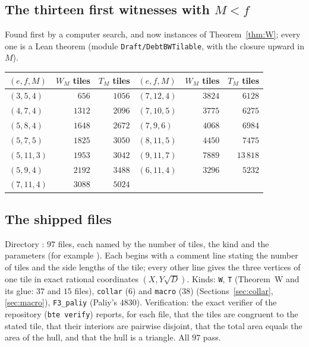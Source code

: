 \documentclass[11pt,reqno]{amsart}
\theoremstyle{plain}
\theoremstyle{definition}
\begin{document}
\subsection{The thirteen first witnesses with $M<f$}
Found first by a computer search, and now instances of Theorem~\ref{thm:W}; every one is a Lean theorem (module \texttt{Draft/DebtBWTilable}, with the closure upward in $M$).
\begin{center}\small
\begin{tabular}{@{}lrr@{\qquad}lrr@{}}
\toprule
$(e,f,M)$ & $W_M$ tiles & $T_M$ tiles & $(e,f,M)$ & $W_M$ tiles & $T_M$ tiles\\
\midrule
$(3,5,4)$ & $656$ & $1056$ & $(7,12,4)$ & $3824$ & $6128$\\
$(4,7,4)$ & $1312$ & $2096$ & $(7,10,5)$ & $3775$ & $6275$\\
$(5,8,4)$ & $1648$ & $2672$ & $(7,9,6)$ & $4068$ & $6984$\\
$(5,7,5)$ & $1825$ & $3050$ & $(8,11,5)$ & $4450$ & $7475$\\
$(5,11,3)$ & $1953$ & $3042$ & $(9,11,7)$ & $7889$ & $13\,818$\\
$(5,9,4)$ & $2192$ & $3488$ & $(6,11,4)$ & $3296$ & $5232$\\
$(7,11,4)$ & $3088$ & $5024$ & & &\\
\bottomrule
\end{tabular}
\end{center}
\subsection{The shipped files}
Directory : $97$ files, each named by the number of tiles, the kind and the parameters (for example ). Each begins with a comment line stating the number of tiles and the side lengths of the tile; every other line gives the three vertices of one tile in exact rational coordinates $(X,Y\sqrt D)$. Kinds: \texttt{W}, \texttt{T} (Theorem~W and its glue: $37$ and $15$ files), \texttt{collar} ($6$) and \texttt{macro} ($38$) (Sections~\ref{sec:collar}, \ref{sec:macro}), \texttt{F3\_paliy} (Paliy's $4830$). Verification: the exact verifier of the repository (\texttt{bte verify}) reports, for each file, that the tiles are congruent to the stated tile, that their interiors are pairwise disjoint, that the total area equals the area of the hull, and that the hull is a triangle. All $97$ pass.
\end{document}
